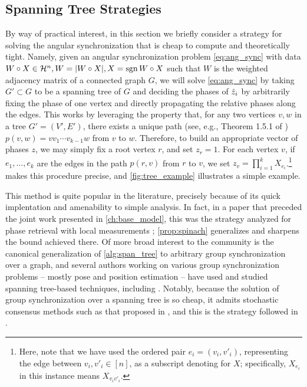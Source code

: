 \subsection{Spanning Tree Strategies}
\label{sec:ang_sync_tree}

By way of practical interest, in this section we briefly consider a strategy for solving the angular synchronization that is cheap to compute and theoretically tight.  Namely, given an angular synchronization problem \eqref{eq:ang_sync} with data $W \circ X \in \mathcal{H}^n, W = \lvert W \circ X\rvert, X = \operatorname{sgn}{W \circ X}$ such that $W$ is the weighted adjacency matrix of a connected graph $G$, we will solve \eqref{eq:ang_sync} by taking $G' \subset G$ to be a spanning tree of $G$ and deciding the phases of $\hat{z}_i$ by arbitrarily fixing the phase of one vertex and directly propagating the relative phases along the edges.  This works by leveraging the property that, for any two vertices $v, w$ in a tree $G' = (V', E')$, there exists a unique path (see, e.g., Theorem 1.5.1 of \cite{diestel2017graphtheory}) $p(v, w) = v v_1 \cdots v_{k-1} w$ from $v$ to $w$.  Therefore, to build an appropriate vector of phases $z$, we may simply fix a root vertex $r$, and set $z_r = 1$.  For each vertex $v$, if $e_1, \ldots, e_k$ are the edges in the path $p(r, v)$ from $r$ to $v$, we set $z_v = \prod_{i = 1}^k X_{e_i}$.\footnote{Here, note that we have used the ordered pair $e_i = (v_i, v'_i)$, representing the edge between $v_i, v'_i \in [n]$, as a subscript denoting for $X$; specifically, $X_{e_i}$ in this instance means $X_{v_i v'_i}$.}   makes this procedure precise, and \cref{fig:tree_example} illustrates a simple example.

This method is quite popular in the literature, precisely because of its quick implentation and amenability to simple analysis.  In fact, in a paper that preceded the joint work presented in \cref{ch:base_model}, this was the strategy analyzed for phase retrieval with local measurements \cite{IVW2015_FastPhase}; \cref{prop:spinach} generalizes and sharpens the bound achieved there.  Of more broad interest to the community is the canonical generalization of \cref{alg:span_tree} to arbitrary group synchronization over a graph, and several authors working on various group synchronization problems -- mostly pose and position estimation -- have used and studied spanning tree-based techniques, including \cite{calafiore2016complex_pgo, calafiore2016planar_pgo, enqvist2011nonsequential,govindu2006motion_avg}.  Notably, because the solution of group synchronization over a spanning tree is so cheap, it admits stochastic consensus methods such as that proposed in \cite{fischler1981ransac}, and this is the strategy followed in \cite{govindu2006motion_avg}.

